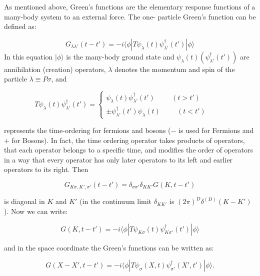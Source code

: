 As mentioned above, Green's functions are the elementary response functions of a many-body system to an external force. The one- particle Green's function can be defined as\cite{Piers}:

\begin{equation}
    G_{\lambda\lambda'}(t-t')=-i \langle\phi|T\psi_\lambda(t)\psi_{\lambda'}^\dagger(t')|\phi\rangle
\end{equation}
In this equation $|\phi\rangle$ is the many-body ground state and  $\psi_\lambda(t)(\psi_{\lambda'}^\dagger(t'))$ are annihilation (creation) operators, $\lambda$ denotes the momentum and spin of the particle $\lambda \equiv P\sigma$, and

\begin{equation}
  T\psi_\lambda(t)\psi_{\lambda'}^\dagger(t')=\begin{cases}
    \psi_\lambda(t)\psi_{\lambda'}^\dagger(t')\hspace{1cm} (t>t')\\
    \pm\psi_{\lambda'}^\dagger(t')\psi_\lambda(t) \hspace{1cm} (t<t') \hspace{1cm} 
  \end{cases}
\end{equation}

\noindent represents the time-ordering for fermions and bosons ($-$ is used for Fermions and$+$ for Bosons). In fact, the time ordering operator takes products of operators, that each operator belongs to a specific time, and modifies the order of operators in a way that every operator has only later operators to its left and earlier operators to its right. Then

\begin{equation}
    G_{K\sigma,K',\sigma'}(t-t')=  \delta_{\sigma\sigma'}\delta_{KK'}G(K,t-t')
\end{equation}

\noindent is diagonal in $K$ and $K'$ (in the continuum limit $\delta_{KK'}$ is $(2\pi)^D\delta^{(D)}(K-K')$). Now we can write:

\begin{equation}
    G(K,t-t')= -i \langle\phi|T\psi_{K\sigma}(t)\psi_{K\sigma'}^\dagger(t')|\phi\rangle
\end{equation}

\noindent and in the space coordinate the Green's functions can be written as:

\begin{equation}
    G(X-X',t-t')= -i \langle\phi|T\psi_{\sigma}(X,t)\psi_{\sigma'}^\dagger(X',t')|\phi\rangle .
\end{equation}


